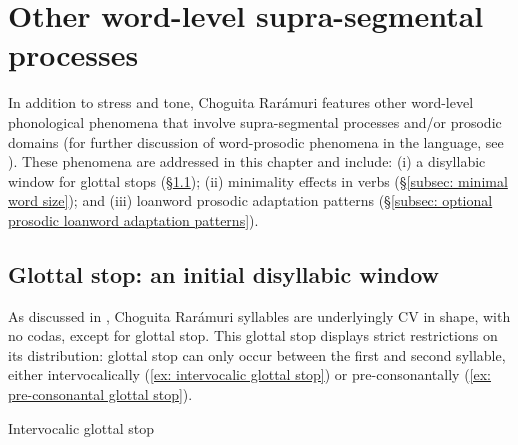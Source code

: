 \chapter{Other word-level supra-segmental processes}
\label{chap: other word-level suprasegmental phonology}

In addition to stress and tone, Choguita Rarámuri features other word-level pho\-nol\-o\-gical phenomena that involve supra-segmental processes and/or prosodic domains (for further discussion of word-prosodic phenomena in the language, see ). These phenomena are addressed in this chapter and include:
(i) a disyllabic window for glottal stops (§\ref{subsec: glottal stop});
(ii) minimality effects in verbs (§\ref{subsec: minimal word size}); and
(iii) loanword prosodic adaptation patterns (§\ref{subsec: optional prosodic loanword adaptation patterns}).


\section{Glottal stop: an initial disyllabic window}
\label{subsec: glottal stop}

As discussed in , Choguita Rarámuri syllables are underlyingly CV in shape, with no codas, except for glottal stop. This glottal stop displays strict restrictions on its distribution: glottal stop can only occur between the first and second syllable, either intervocalically (\ref{ex: intervocalic glottal stop}) or pre-consonantally (\ref{ex: pre-consonantal glottal stop}).

\ea\label{ex: intervocalic glottal stop}
{Intervocalic glottal stop}

   \z
\z

